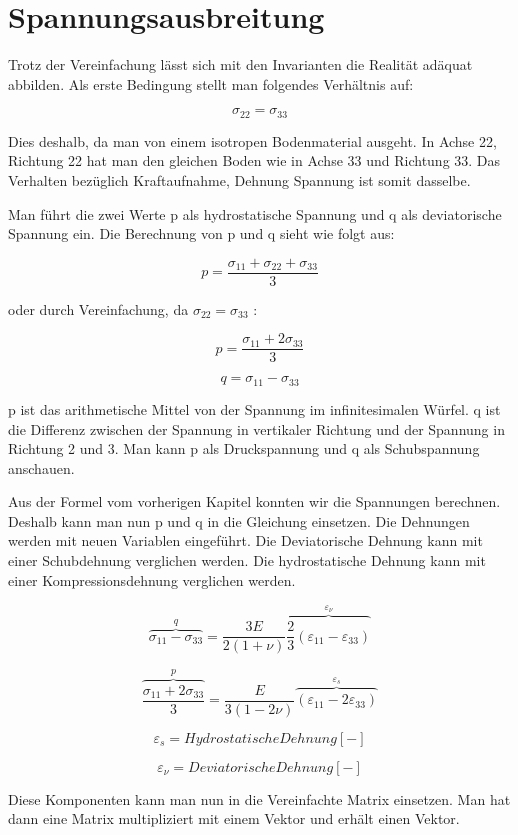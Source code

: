 \section{Spannungsausbreitung\label{spannung:section:Invarianten}}
Trotz der Vereinfachung lässt sich mit den Invarianten die Realität adäquat abbilden.
Als erste Bedingung stellt man folgendes Verhältnis auf:

\[
\sigma_{22}
=
\sigma_{33}
\]

Dies deshalb, da man von einem isotropen Bodenmaterial ausgeht.
In Achse 22, Richtung 22 hat man den gleichen Boden wie in Achse 33 und Richtung 33.
Das Verhalten bezüglich Kraftaufnahme, Dehnung Spannung ist somit dasselbe.

Man führt die zwei Werte p als hydrostatische Spannung und q als deviatorische Spannung ein.
Die Berechnung von p und q sieht wie folgt aus:

\[
p
=
\frac{\sigma_{11}+\sigma_{22}+\sigma_{33}}{3}
\]

oder durch Vereinfachung, da $\sigma_{22}=\sigma_{33}$ :

\[
p
=
\frac{\sigma_{11}+2\sigma_{33}}{3}
\]

\[
q
=
\sigma_{11}-\sigma_{33}
\]

p ist das arithmetische Mittel von der Spannung im infinitesimalen Würfel.
q ist die Differenz zwischen der Spannung in vertikaler Richtung und der Spannung in Richtung 2 und 3.
Man kann p als Druckspannung und q als Schubspannung anschauen.

Aus der Formel vom vorherigen Kapitel konnten wir die Spannungen berechnen.
Deshalb kann man nun p und q in die Gleichung einsetzen.
Die Dehnungen werden mit neuen Variablen eingeführt.
Die Deviatorische Dehnung kann mit einer Schubdehnung verglichen werden.
Die hydrostatische Dehnung kann mit einer Kompressionsdehnung verglichen werden.

\[
\overbrace{\sigma_{11}-\sigma_{33}}^{q}
=
\frac{3E}{2(1+\nu)} \overbrace{\frac{2}{3}(\varepsilon_{11} - \varepsilon_{33})}^{\varepsilon_{\nu}}
\]

\[
\overbrace{\frac{\sigma_{11}+2\sigma_{33}}{3}}^{p}
=
\frac{E}{3(1-2\nu)} \overbrace{(\varepsilon_{11} - 2\varepsilon_{33})}^{\varepsilon_{s}}
\]

\[
\varepsilon_{s}
=
Hydrostatische Dehnung [-]
\]

\[
\varepsilon_{\nu}
=
Deviatorische Dehnung [-]
\]

Diese Komponenten kann man nun in die Vereinfachte Matrix einsetzen.
Man hat dann eine Matrix multipliziert mit einem Vektor und erhält einen Vektor.

